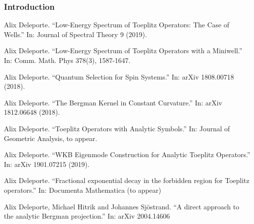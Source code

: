 \documentclass[mathserif]{beamer}
\begin{document}
      \begin{frame}
        \frametitle{Introduction}
        {\footnotesize
        \begin{description}
        \item<1>[{[D. 2019]}] Alix Deleporte. “Low-Energy Spectrum of Toeplitz Operators: The Case
of Wells.” In: Journal of Spectral Theory 9 (2019).
\item<1-2> [{[D. 2020a]}] Alix Deleporte. “Low-Energy Spectrum of Toeplitz Operators with a
Miniwell.” In: Comm. Math. Phys 378(3), 1587-1647.
\item<1>[{[D. 2018a++]}] Alix Deleporte. “Quantum Selection for Spin Systems.” In: arXiv
1808.00718 (2018).
\item<1>[{[D. 2018b++]}] Alix Deleporte. “The Bergman Kernel in Constant Curvature.” In:
arXiv 1812.06648 (2018).
\item<1-2>[{[D. 2020b]}] Alix Deleporte. “Toeplitz Operators with Analytic Symbols.” In: Journal of Geometric Analysis, to appear.
\item<1>[{[D. 2019++]}] Alix Deleporte. “WKB Eigenmode Construction for Analytic Toeplitz
  Operators.” In: arXiv 1901.07215 (2019).
  \item<1-2>[{[D. 2020c]}] Alix Deleporte. ``Fractional exponential
    decay in the forbidden region for Toeplitz operators.'' In: Documenta Mathematica (to appear)
\item<1>[{[DHS 2020++]}] Alix Deleporte, Michael Hitrik and Johannes Sjöstrand. “A direct approach to the analytic Bergman projection.” In: arXiv 2004.14606
        \end{description}}
      \end{frame}

      
\end{document}
